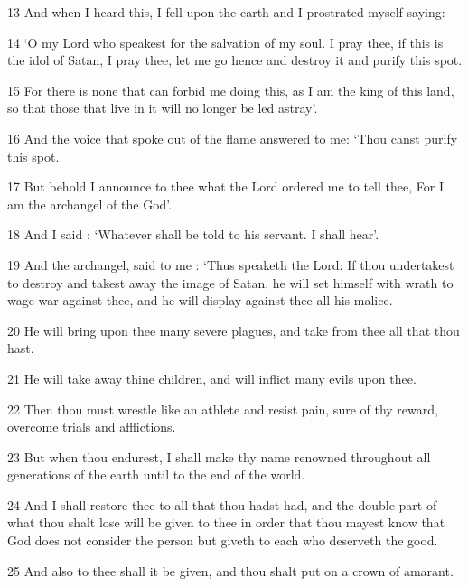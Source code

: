 \par 13 And when I heard this, I fell upon the earth and I prostrated myself saying: 

\par 14 ‘O my Lord who speakest for the salvation of my soul. I pray thee, if this is the idol of Satan, I pray thee, let me go hence and destroy it and purify this spot. 

\par 15 For there is none that can forbid me doing this, as I am the king of this land, so that those that live in it will no longer be led astray’.

\par 16 And the voice that spoke out of the flame answered to me: ‘Thou canst purify this spot. 

\par 17 But behold I announce to thee what the Lord ordered me to tell thee, For I am the archangel of the God’. 

\par 18 And I said : ‘Whatever shall be told to his servant. I shall hear’. 

\par 19 And the archangel, said to me : ‘Thus speaketh the Lord: If thou undertakest to destroy and takest away the image of Satan, he will set himself with wrath to wage war against thee, and he will display against thee all his malice. 

\par 20 He will bring upon thee many severe plagues, and take from thee all that thou hast. 

\par 21 He will take away thine children, and will inflict many evils upon thee. 

\par 22 Then thou must wrestle like an athlete and resist pain, sure of thy reward, overcome trials and afflictions.

\par 23 But when thou endurest, I shall make thy name renowned throughout all generations of the earth until to the end of the world. 

\par 24 And I shall restore thee to all that thou hadst had, and the double part of what thou shalt lose will be given to thee in order that thou mayest know that God does not consider the person but giveth to each who deserveth the good. 

\par 25 And also to thee shall it be given, and thou shalt put on a crown of amarant. 

